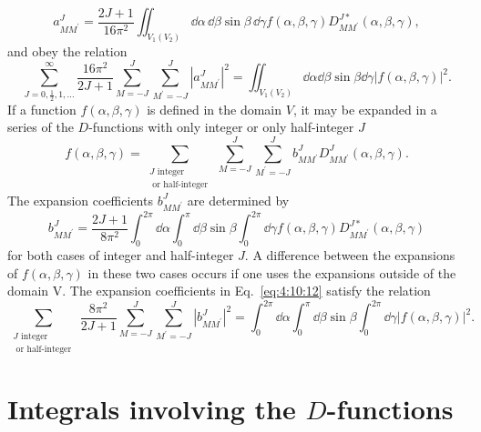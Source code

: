 \begin{equation}
a_{M M^{\prime}}^{J}=\frac{2 J+1}{16 \pi^{2}} \iint_{V_{1}\left(V_{2}\right)} \dd \alpha\, \dd \beta \sin \beta\, \dd \gamma f(\alpha, \beta, \gamma) D_{M M^{\prime}}^{J *}(\alpha, \beta, \gamma) ,\label{eq:4:10:10}
\end{equation}
and obey the relation
\begin{equation}
\sum_{J=0, \frac{1}{2}, 1, \ldots}^{\infty} \frac{16 \pi^{2}}{2 J+1} \sum_{M=-J}^{J} \sum_{M^{\prime}=-J}^{J}\left|a_{M M^{\prime}}^{J}\right|^{2}=\iint_{V_{1}\left(V_{2}\right)} \dd \alpha \dd \beta \sin \beta \dd \gamma|f(\alpha, \beta, \gamma)|^{2} .\label{eq:4:10:11}
\end{equation}
If a function $f(\alpha, \beta, \gamma)$ is defined in the domain $V$, it may be expanded in a series of the $D$-functions with only integer or only half-integer $J$
\begin{equation}
f(\alpha, \beta, \gamma)=\sum_{\substack{J \text { integer } \\ \text { or half-integer }}} \sum_{M=-J}^{J} \sum_{M^{\prime}=-J}^{J} b_{M M^{\prime}}^{J} D_{M M^{\prime}}^{J}(\alpha, \beta, \gamma) .\label{eq:4:10:12}
\end{equation}
The expansion coefficients $b_{M M^{\prime}}^{J}$ are determined by
\begin{equation}
b_{M M^{\prime}}^{J}=\frac{2 J+1}{8 \pi^{2}} \int_{0}^{2 \pi} \dd \alpha \int_{0}^{\pi} \dd \beta \sin \beta \int_{0}^{2 \pi} \dd \gamma f(\alpha, \beta, \gamma) D_{M M^{\prime}}^{J *}(\alpha, \beta, \gamma) \label{eq:4:10:13}
\end{equation}
for both cases of integer and half-integer $J$. A difference between the expansions of $f(\alpha, \beta, \gamma)$ in these two cases occurs if one uses the expansions outside of the domain V. The expansion coefficients in Eq.~\eqref{eq:4:10:12} satisfy the relation
\begin{equation}
\sum_{\substack{J \text { integer } \\ \text { or half-integer }}} \frac{8 \pi^{2}}{2 J+1} \sum_{M=-J}^{J} \sum_{M^{\prime}=-J}^{J}\left|b_{M M^{\prime}}^{J}\right|^{2}=\int_{0}^{2 \pi} \dd \alpha \int_{0}^{\pi} \dd \beta \sin \beta \int_{0}^{2 \pi} \dd \gamma|f(\alpha, \beta, \gamma)|^{2} .\label{eq:4:10:14}
\end{equation}
\section{Integrals involving the $D$-functions}\label{sec:4.11}
